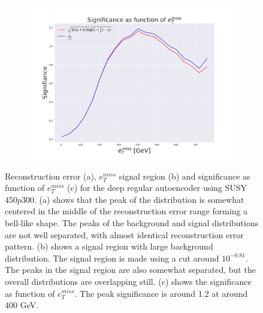 \begin{figure}[H]
\begin{subfigure}{.40\textwidth}
        \caption{}
        \label{fig:VAE_2lep_big_etmiss_450_2}
    \end{subfigure}
    \hfill 
    \begin{subfigure}{.40\textwidth}
        \includegraphics[width=\textwidth]{Figures/VAE_testing/big/2lep/significance_etmiss_450p0p0300_-0.6091405575830948.pdf}
        \caption{}
        \label{fig:VAE_2lep_big_signi_450_2}
    \end{subfigure}
    \hfill      
    \caption[2lep deep network | $450p300$ | VAE | 2]{Reconstruction error (a), $e_T^{miss}$ signal region (b) and significance as function of 
    $e_T^{miss}$ (c) for the deep regular autoencoder using SUSY $450p300$. 
    (a) shows that the peak of the distribution is somewhat centered in the middle 
    of the reconstruction error range forming a bell-like shape. The peaks of the background and signal 
    distributions are not well separated, with almost identical reconstruction error pattern. (b) 
    shows a signal region with large background distribution. The signal region is made using a cut around
    $10^{-0.81}$. The peaks in the signal region are also somewhat 
    separated, but the overall distributions are overlapping still. 
    (c) shows the significance as function of $e_T^{miss}$. 
    The peak significance is around 1.2 at around 400 GeV.}
    \label{fig:VAE_2lep_big_rec_sig_signi_450_2}
\end{figure}

